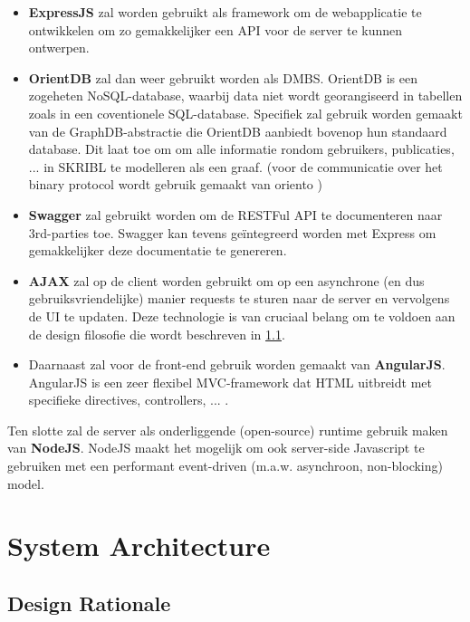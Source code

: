 \documentclass{article}
\begin{document}
\begin{itemize}

\item \textbf{ExpressJS} zal worden gebruikt als framework om de webapplicatie te ontwikkelen om zo gemakkelijker een API voor de server te kunnen ontwerpen\cite{website:ExpressJS}. 

\item \textbf{OrientDB} zal dan weer gebruikt worden als DMBS\cite{website:OrientDB}. OrientDB is een zogeheten NoSQL-database, waarbij data niet wordt georangiseerd in tabellen zoals in een coventionele SQL-database. Specifiek zal gebruik worden gemaakt van de GraphDB-abstractie die OrientDB aanbiedt bovenop hun standaard database. 
Dit laat toe om om alle informatie rondom gebruikers, publicaties, ... in SKRIBL te modelleren als een graaf. (voor de communicatie over het binary protocol wordt gebruik gemaakt van oriento \cite{website:Oriento}) 

\item \textbf{Swagger} zal gebruikt worden om de RESTFul API te documenteren naar 3rd-parties toe\cite{website:Swagger}. Swagger kan tevens ge\"integreerd worden met Express om gemakkelijker deze documentatie te genereren. 

\item \textbf{AJAX} zal op de client worden gebruikt om op een asynchrone (en dus gebruiksvriendelijke) manier requests te sturen naar de server en vervolgens de UI te updaten. Deze technologie is van cruciaal belang om te voldoen aan de design filosofie die wordt beschreven in \ref{sec:rationale}.

\item Daarnaast zal voor de front-end gebruik worden gemaakt van \textbf{AngularJS}. AngularJS  is een zeer flexibel MVC-framework dat HTML uitbreidt met specifieke directives, controllers, ... \cite{website:AngularJS}. 
\end{itemize}

Ten slotte zal de server als onderliggende (open-source) runtime gebruik maken van \textbf{NodeJS}. NodeJS maakt het mogelijk om ook server-side Javascript te gebruiken met een performant event-driven (m.a.w. asynchroon, non-blocking) model\cite{website:NodeJS}. 

\section{System Architecture}

\subsection{Design Rationale}
\label{sec:rationale}
\end{document}
